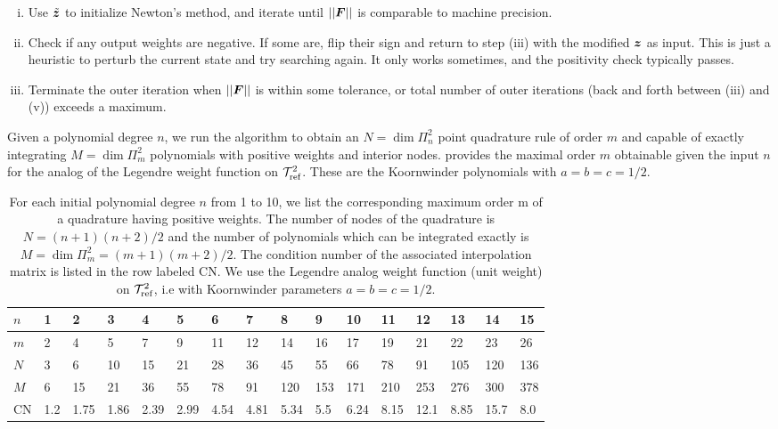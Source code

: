 \begin{enumerate}[(i)]
\item Use $\tilde{\boldsymbol{z}}$ to initialize Newton's method, and iterate until $||\boldsymbol{F}||$ is comparable to machine precision. 
\item Check if any output weights are negative. If some are, flip their sign and return to step (iii) with the modified $\boldsymbol{z}$ as input. \color{red} This is just a heuristic to perturb the current state and try searching again. It only works sometimes, and the positivity check typically passes.\color{black}
\item Terminate the outer iteration when $||\boldsymbol{F}||$ is within some tolerance, or total number of outer iterations (back and forth between (iii) and (v)) exceeds a maximum.
\end{enumerate}

Given a polynomial degree $n$, we run the algorithm to obtain an $N=\dim\Pi_{n}^2$ point quadrature rule of order $m$ and capable of exactly integrating $M=\dim\Pi_m^2$ polynomials with positive weights and interior nodes.  provides the maximal order $m$ obtainable given the input $n$ for the analog of the Legendre weight function on $\mathcal{T}_{\text{ref}}^2$. These are the Koornwinder polynomials with $a=b=c=1/2$.
\begin{table}[H]
	\centering
	\caption{For each initial polynomial degree $n$ from 1 to 10, we list the
		corresponding maximum order m of a quadrature having positive weights. The number of nodes of the quadrature is $N = (n + 1)(n + 2)/2$ and the number of polynomials which can be integrated exactly is $M = \dim\Pi_m^2 = (m + 1)(m + 2)/2$. The condition number of the associated interpolation matrix is listed in the row labeled CN. We use the Legendre analog weight function (unit weight) on $\mathcal{T}_{\text{ref}}^2$, i.e with Koornwinder parameters $a=b=c=1/2$.}\label{tab:quadverif}
	\begin{tabular}{|l|l|l|l|l|l|l|l|l|l|l|l|l|l|l|l|}
		\hline
		$n$ & 1   & 2   & 3   & 4   & 5   & 6   & 7    & 8    & 9    & 10   & 11   & 12   & 13   & 14 & 15 \\ \hline
		$m$ & 2   & 4   & 5   & 7   & 9   & 11  & 12   & 14   & 16   & 17   & 19   & 21   & 22   & 23 & 26  \\ \hline
		$N$ & 3   & 6   & 10  & 15  & 21  & 28  & 36   & 45   & 55   & 66   & 78   & 91   & 105  & 120 & 136 \\ \hline
		$M$ & 6   & 15  & 21  & 36  & 55  & 78  & 91   & 120  & 153  & 171  & 210  & 253  & 276  & 300 & 378 \\ \hline
		CN  & 1.2 & 1.75 & 1.86 & 2.39 & 2.99 & 4.54 & 4.81 & 5.34 & 5.5 & 6.24 & 8.15 & 12.1 & 8.85 & 15.7 & 8.0  \\ \hline
	\end{tabular}
\end{table}
